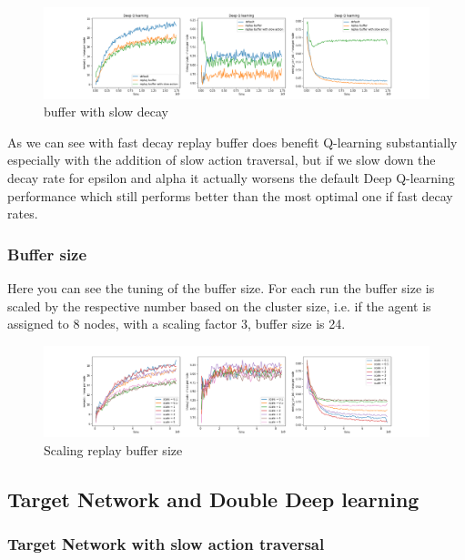\begin{figure}[H]
\centering
\hspace*{-3.3cm}  
\includegraphics[scale=0.40]{plots/replay_buffer/replay_buffer_with_slow_action_traversal_deep_q_SMALL.png}
  \caption{buffer with slow decay}
  \label{fig:buffer_slow_decay}
\end{figure}

As we can see with fast decay replay buffer does benefit Q-learning substantially especially with the addition of slow action traversal, but if we slow down the decay rate for epsilon and alpha it actually worsens 
the default Deep Q-learning performance which still
performs better than the most optimal one 
if fast decay rates.

\subsubsection{Buffer size}
Here you can see the tuning of the buffer size.
For each run the buffer size is scaled by the 
respective number based on the cluster size, i.e.
if the agent is assigned to 8 nodes, with a scaling
factor 3, buffer size is 24. 

\begin{figure}[H]
\centering
\hspace*{-3.3cm}  
\includegraphics[scale=0.40]{plots/replay_buffer/replay_buffer_scale_deep_q_SMALL.png}
  \caption{Scaling replay buffer size}
\end{figure}

\subsection{Target Network and Double Deep learning}

\subsubsection{Target Network with slow action traversal}

